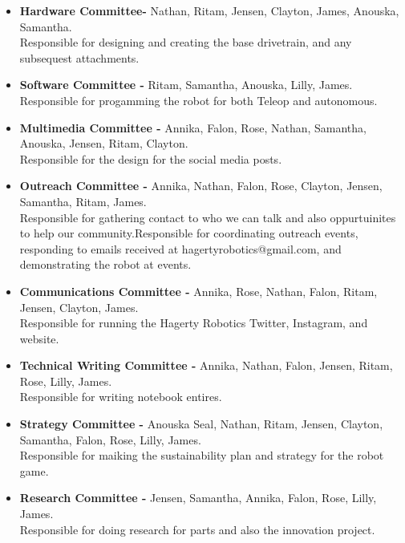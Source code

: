 
\begin{itemize}

\item \textbf{Hardware Committee-} Nathan, Ritam, Jensen, Clayton, James, Anouska, Samantha. \\ Responsible for designing and creating the base drivetrain, and any subsequest attachments.

\item \textbf{Software Committee -} Ritam, Samantha, Anouska, Lilly, James.  \\ Responsible for progamming the robot for both Teleop and autonomous.

\item \textbf{Multimedia Committee -} Annika, Falon, Rose, Nathan, Samantha, Anouska, Jensen, Ritam, Clayton. \\Responsible for the design for the social media posts.

\item \textbf{Outreach Committee -} Annika, Nathan, Falon, Rose, Clayton, Jensen, Samantha, Ritam, James. \\  Responsible for gathering contact to who we can talk and also oppurtuinites to help our community.Responsible for coordinating outreach events, responding to emails received at hagertyrobotics@gmail.com, and demonstrating the robot at events.

\item \textbf{Communications Committee -} Annika, Rose, Nathan, Falon, Ritam, Jensen, Clayton, James. \\ 
Responsible for running the Hagerty Robotics Twitter, Instagram, and website. 

\item \textbf{Technical Writing Committee -} Annika, Nathan, Falon, Jensen, Ritam, Rose, Lilly, James. \\
Responsible for writing notebook entires. 

\item \textbf{Strategy Committee -} Anouska Seal, Nathan, Ritam, Jensen, Clayton, Samantha, Falon, Rose, Lilly, James. \\ Responsible for maiking the sustainability plan and strategy for the robot game. 

\item \textbf{Research Committee -} Jensen, Samantha, Annika, Falon, Rose, Lilly, James. \\ Responsible for doing research for parts and also the innovation project.

\end{itemize} 
